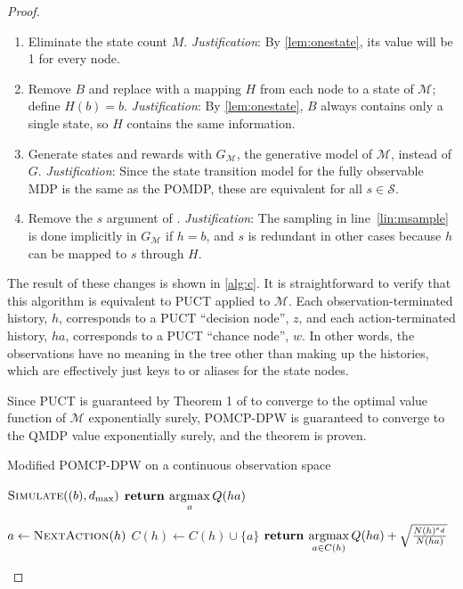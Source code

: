 \begin{proof}
    \begin{enumerate}
        \item Eliminate the state count $M$. \emph{Justification}: By \cref{lem:onestate}, its value will be 1 for every node.
        \item Remove $B$ and replace with a mapping $H$ from each node to a state of $\mathcal{M}$; define $H(b) = b$. \emph{Justification}: By \cref{lem:onestate}, $B$ always contains only a single state, so $H$ contains the same information.
        \item Generate states and rewards with $G_\mathcal{M}$, the generative model of $\mathcal{M}$, instead of $G$. \emph{Justification}: Since the state transition model for the fully observable MDP is the same as the POMDP, these are equivalent for all $s \in \mathcal{S}$.
        \item Remove the $s$ argument of . \emph{Justification}: The sampling in line~\ref{lin:msample} is done implicitly in $G_\mathcal{M}$ if $h=b$, and $s$ is redundant in other cases because $h$ can be mapped to $s$ through $H$.
    \end{enumerate}

    The result of these changes is shown in \cref{alg:c}. It is straightforward to verify that this algorithm is equivalent to PUCT applied to $\mathcal{M}$.
    Each observation-terminated history, $h$, corresponds to a PUCT ``decision node'', $z$, and each action-terminated history, $ha$, corresponds to a PUCT ``chance node'', $w$.
    In other words, the observations have no meaning in the tree other than making up the histories, which are effectively just keys to or aliases for the state nodes.
    
    Since PUCT is guaranteed by Theorem 1 of \citet{auger2013continuous} to converge to the optimal value function of $\mathcal{M}$ exponentially surely, POMCP-DPW is guaranteed to converge to the QMDP value exponentially surely, and the theorem is proven.

\begin{algorithm}[htb]
    \caption{Modified POMCP-DPW on a continuous observation space} \label{alg:c}
    \begin{algorithmic}[1]
                \State $\Call{Simulate}{(b), d_\text{max}}$
            \EndFor
            \State $\textbf{return } \underset{a}{\argmax}\, Q(ha)$
        \EndProcedure

                \State $a \gets \Call{NextAction}{h}$
                \State $C(h) \gets C(h) \cup \{a\}$
            \EndIf
            \State $\textbf{return } \underset{a \in C(h)}{\argmax}\, Q(ha) + \sqrt{\frac{N(h)^{e_d}}{N(ha)}}$
        \EndProcedure


\end{algorithmic}
\end{algorithm}
\end{proof}
